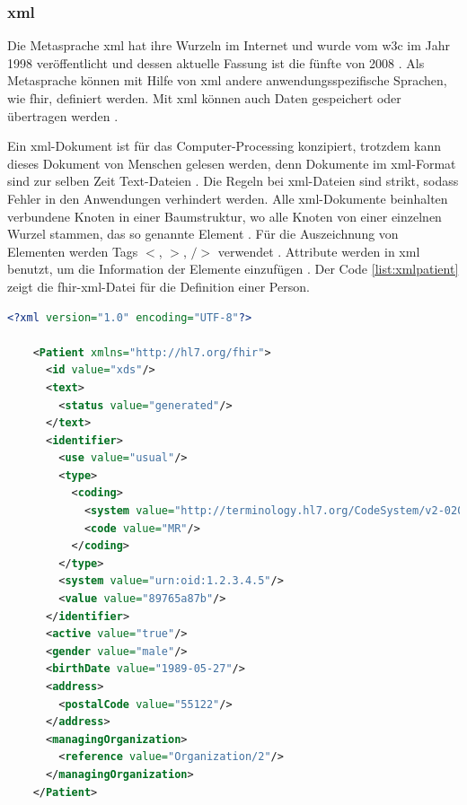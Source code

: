 \subsubsection{\acs{xml}} \label{subsubsec:xml}

Die Metasprache \acf{xml} hat ihre Wurzeln im Internet und wurde vom \ac{w3c} im Jahr 1998 veröffentlicht und dessen aktuelle Fassung ist die fünfte von 2008 \cite{grundinfo}. Als Metasprache können mit Hilfe von \ac{xml} andere anwendungsspezifische Sprachen, wie \ac{fhir}, definiert werden. Mit \ac{xml} können auch Daten gespeichert oder übertragen werden \cite{interop, grundinfo}.

Ein \ac{xml}-Dokument ist für das Computer-Processing konzipiert, trotzdem kann dieses Dokument von Menschen gelesen werden, denn Dokumente im \ac{xml}-Format sind zur selben Zeit Text-Dateien \cite{grundinfo}. Die Regeln bei \ac{xml}-Dateien sind strikt, sodass Fehler in den Anwendungen verhindert werden. Alle \ac{xml}-Dokumente beinhalten verbundene Knoten in einer Baumstruktur, wo alle Knoten von einer einzelnen Wurzel stammen, das so genannte Element \cite{interop}. Für die Auszeichnung von Elementen werden Tags \glqq $<$, $>$, $/$$>$ \grqq{} verwendet \cite{grundinfo}. Attribute werden in \ac{xml} benutzt, um die Information der Elemente einzufügen \cite{interop, quality}. Der Code \ref{list:xmlpatient} zeigt die \ac{fhir}-\ac{xml}-Datei für die Definition einer Person.

\begin{lstlisting}[caption={[Beispiel einer \acs{fhir}-Ressource in XML] Beispiel einer \acs{fhir}-Ressource für eine Person in XML.},language=xml, label=list:xmlpatient, captionpos=b]
	<?xml version="1.0" encoding="UTF-8"?> 
	
	<Patient xmlns="http://hl7.org/fhir">
	  <id value="xds"/> 
	  <text> 
	    <status value="generated"/>
	  </text> 
	  <identifier> 
	    <use value="usual"/> 
 	    <type> 
	      <coding> 
	        <system value="http://terminology.hl7.org/CodeSystem/v2-0203"/> 
	        <code value="MR"/> 
	      </coding> 
	    </type> 
	    <system value="urn:oid:1.2.3.4.5"/> 
	    <value value="89765a87b"/> 
	  </identifier> 
	  <active value="true"/> 
	  <gender value="male"/> 
	  <birthDate value="1989-05-27"/> 
	  <address> 
	    <postalCode value="55122"/> 
	  </address> 
	  <managingOrganization> 
	    <reference value="Organization/2"/> 
	  </managingOrganization> 
	</Patient>
\end{lstlisting}

